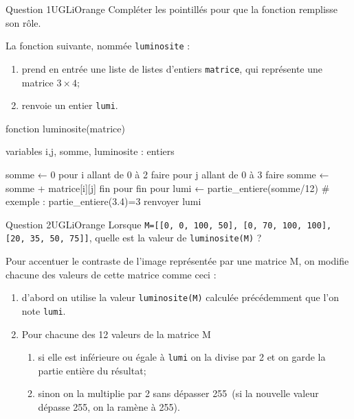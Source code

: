 \begin{encadrecolore}{Question 1}{UGLiOrange}
Compléter les pointillés pour que la fonction remplisse son rôle.
\end{encadrecolore} 


La fonction suivante, nommée \texttt{luminosite} :
\begin{enumerate}[--]
	\item prend en entrée une liste de listes d'entiers \texttt{matrice}, qui représente une matrice $3\times 4$;
    \item renvoie un entier \texttt{lumi}.
\end{enumerate}

\begin{algo}    
fonction luminosite(matrice)
    
    variables
        i,j, somme, luminosite : entiers 

    somme ← 0
    pour i allant de 0 à 2 faire
        pour j allant de 0 à 3 faire
            somme ← somme + matrice[i][j]
        fin pour
    fin pour
    lumi ← partie_entiere(somme/12) # exemple : partie_entiere(3.4)=3
    renvoyer lumi
\end{algo}

\begin{encadrecolore}{Question 2}{UGLiOrange}
Lorsque \texttt{M=[[0, 0, 100, 50], [0, 70, 100, 100], [20, 35, 50, 75]]}, quelle est la valeur de \texttt{luminosite(M)} ?
\end{encadrecolore} 


Pour accentuer le contraste de l'image représentée par une matrice M, on modifie chacune des valeurs de cette matrice comme ceci :
\begin{enumerate}[--]
	\item d'abord on utilise la valeur \texttt{luminosite(M)} calculée précédemment que l'on note \texttt{lumi}.
    \item Pour chacune des 12 valeurs de la matrice M
    \begin{enumerate}[--]
    	\item si elle est inférieure ou égale à \texttt{lumi} on la divise par 2 et on garde la partie entière du résultat;
        \item sinon on la multiplie par 2 sans dépasser 255 (si la nouvelle valeur dépasse 255, on la ramène à 255).   
    \end{enumerate}    
\end{enumerate}

